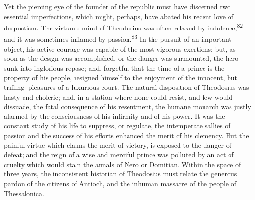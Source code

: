 Yet the piercing eye of the founder of the republic must have
discerned two essential imperfections, which might, perhaps, have
abated his recent love of despostism. The virtuous mind of
Theodosius was often relaxed by indolence,\textsuperscript{82} and it was
sometimes inflamed by passion.\textsuperscript{83} In the pursuit of an important
object, his active courage was capable of the most vigorous
exertions; but, as soon as the design was accomplished, or the
danger was surmounted, the hero sunk into inglorious repose; and,
forgetful that the time of a prince is the property of his
people, resigned himself to the enjoyment of the innocent, but
trifling, pleasures of a luxurious court. The natural disposition
of Theodosius was hasty and choleric; and, in a station where
none could resist, and few would dissuade, the fatal consequence
of his resentment, the humane monarch was justly alarmed by the
consciousness of his infirmity and of his power. It was the
constant study of his life to suppress, or regulate, the
intemperate sallies of passion and the success of his efforts
enhanced the merit of his clemency. But the painful virtue which
claims the merit of victory, is exposed to the danger of defeat;
and the reign of a wise and merciful prince was polluted by an
act of cruelty which would stain the annals of Nero or Domitian.
Within the space of three years, the inconsistent historian of
Theodosius must relate the generous pardon of the citizens of
Antioch, and the inhuman massacre of the people of Thessalonica.



